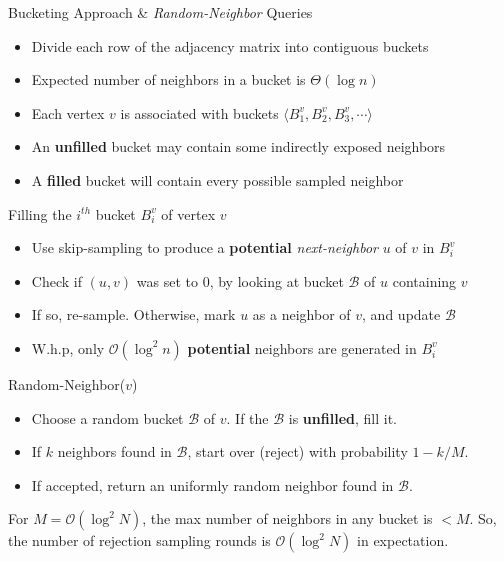 \begin{block}{Bucketing Approach \& \emph{Random-Neighbor} Queries}

\begin{itemize}
    \item Divide each row of the adjacency matrix into contiguous buckets
    \item Expected number of neighbors in a bucket is $\Theta(\log n)$
    \item Each vertex $v$ is associated with buckets $ \langle B^v_1, B^v_2, B^v_3,\cdots\rangle$
    \item An \textbf{unfilled} bucket may contain some indirectly exposed neighbors
    \item A \textbf{filled} bucket will contain every possible sampled neighbor
\end{itemize}


\begin{alertblock}{Filling the $i^{th}$ bucket $B^v_i$ of vertex $v$}
\begin{itemize}
    \item Use skip-sampling to produce a \textbf{potential} \emph{next-neighbor} $u$ of $v$ in $B^v_i$
    \item Check if $(u, v)$ was set to $0$, by looking at bucket $\mathcal B$ of $u$ containing $v$
    \item If so, re-sample. Otherwise, mark $u$ as a neighbor of $v$, and update $\mathcal B$
    \item W.h.p, only $\mathcal O(\log^2 n)$ \textbf{potential} neighbors are generated in $B^v_i$
\end{itemize}
\end{alertblock}

\end{block}



\vspace{-0.2in}


\begin{alertblock}{Random-Neighbor($v$)}
\begin{itemize}
    \item Choose a random bucket $\mathcal B$ of $v$. If the $\mathcal B$ is \textbf{unfilled}, fill it.
    \item If $k$ neighbors found in $\mathcal B$, start over (reject) with probability $1-k/M$.
    \item If accepted, return an uniformly random neighbor found in $\mathcal B$.
\end{itemize}
For $M = \mathcal O(\log^2 N)$, the max number of neighbors in any bucket is $<M$.
So, the number of rejection sampling rounds is $\mathcal O(\log^2 N)$ in expectation.
\end{alertblock}

